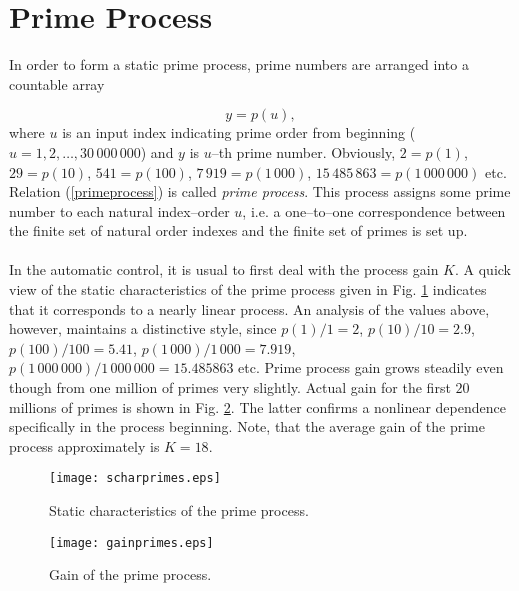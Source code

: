 \documentclass[12pt,a4paper,twoside]{article}
\begin{document}
\section{Prime Process}   

\vspace{0.3cm}\noindent In order to form a static prime process, prime numbers are arranged into a countable array 

\begin{equation}
y=p(u), \label{primeprocess}
\end{equation}
where $u$ is an input index indicating prime order from beginning ($u = 1,2, \ldots, 30\,000\,000$) and $y$ is $u$--th prime number. Obviously, $2=p(1)$, $29=p(10)$, $541=p(100)$, $7\,919=p(1\,000)$, $15\,485\,863=p(1\,000\,000)$ etc. Relation (\ref{primeprocess}) is called {\it prime process}. This process assigns some prime number to each natural index--order $u$, i.e. a one--to--one correspondence between the finite set of natural order indexes and the finite set of primes is set up.\\
\\
In the automatic control, it is usual to first deal with the process gain $K$. A quick view of the static characteristics of the prime process given in Fig. \ref{statchar} indicates that it corresponds to a nearly linear process. An analysis of the values above, however, maintains a distinctive style, since $ p(1) / 1 = 2$, $p(10) / 10 = 2.9$, $p(100) / 100 = 5.41 $, $p(1\,000) / 1 \, 000 = 7.919$, $p(1 \, 000 \, 000) / 1 \, 000 \, 000 = 15.485863$ etc. Prime process gain grows steadily even though from one million of primes very slightly. Actual gain for the first $20$ millions of primes is shown in Fig. \ref{gain}. The latter confirms a nonlinear dependence specifically in the process beginning. Note, that the average gain of the prime process approximately is $K =  18$.

\begin{figure}[htb]
\centering
\texttt{[image: scharprimes.eps]}
\caption{\small Static characteristics of the prime process.}
\label{statchar}
\end{figure}

\begin{figure}[htb]
\centering
\texttt{[image: gainprimes.eps]}
\caption{\small Gain of the prime process.}
\label{gain}
\end{figure}
\end{document}
